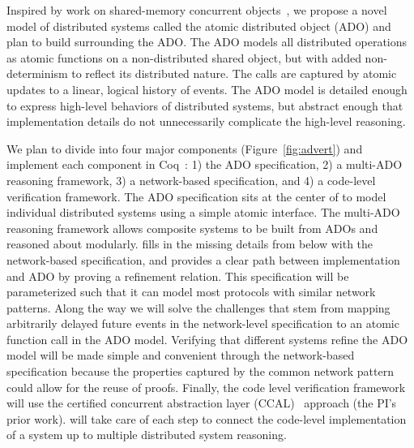 \documentclass[11pt]{article}
\begin{document}
Inspired by work on shared-memory concurrent
objects~\cite{herlihy08book, lintextbook}, we propose a novel model of
distributed systems called the atomic distributed object (ADO) and
plan to build \sysname{} surrounding the ADO.  The ADO models all
distributed operations as atomic functions on a non-distributed shared
object, but with added non-determinism to reflect its distributed
nature. The calls are captured by atomic updates to a linear, logical
history of events. The ADO model is detailed enough to express
high-level behaviors of distributed systems, but abstract enough that
implementation details do not unnecessarily complicate the high-level
reasoning.

We plan to divide \sysname{} into four major components
(Figure~\ref{fig:advert}) and implement each component in
Coq~\cite{coq}: 1) the ADO specification, 2) a multi-ADO reasoning
framework, 3) a network-based specification, and 4) a code-level
verification framework.  The ADO specification sits at the center of
\sysname{} to model individual distributed systems using a simple
atomic interface. The multi-ADO reasoning framework allows composite
systems to be built from ADOs and reasoned about modularly. \sysname{}
fills in the missing details from below with the network-based
specification, and provides a clear path between implementation and
ADO by proving a refinement relation. This specification will be
parameterized such that it can model most protocols with similar
network patterns. Along the way we will solve the challenges that stem
from mapping arbitrarily delayed future events in the network-level
specification to an atomic function call in the ADO model. Verifying
that different systems refine the ADO model will be made simple and
convenient through the network-based specification because the
properties captured by the common network pattern could allow for the
reuse of proofs. Finally, the code level verification framework will
use the certified concurrent abstraction layer
(CCAL)~\cite{concurrency} approach (the PI's prior work).  \sysname{}
will take care of each step to connect the code-level implementation
of a system up to multiple distributed system reasoning.
\end{document}
